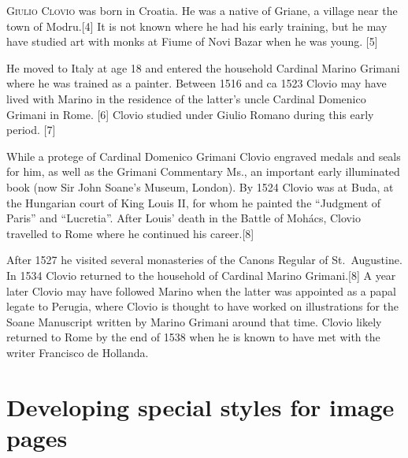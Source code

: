 \begin{greco}
\noindent \lettrine{G}{iulio Clovio} was born in Croatia. He was a native of Griane, a village near the town of Modru.[4] It is not known where he had his early training, but he may have studied art with monks at Fiume of Novi Bazar when he was young. [5] 

He moved to Italy at age 18 and entered the household Cardinal Marino Grimani where he was trained as a painter. Between 1516 and ca 1523 Clovio may have lived with Marino in the residence of the latter’s uncle Cardinal Domenico Grimani in Rome. [6] Clovio studied under Giulio Romano during this early period. [7]

While a protege of Cardinal Domenico Grimani Clovio engraved medals and seals for him, as well as the Grimani Commentary Ms., an important early illuminated book (now Sir John Soane's Museum, London).
By 1524 Clovio was at Buda, at the Hungarian court of King Louis II, for whom he painted the ``Judgment of Paris'' and ``Lucretia''. After Louis' death in the Battle of Mohács, Clovio travelled to Rome where he continued his career.[8]

After 1527 he visited several monasteries of the Canons Regular of St.~Augustine. In 1534 Clovio returned to the household of Cardinal Marino Grimani.[8] A year later Clovio may have followed Marino when the latter was appointed as a papal legate to Perugia, where Clovio is thought to have worked on illustrations for the Soane Manuscript written by Marino Grimani around that time. Clovio likely returned to Rome by the end of 1538 when he is known to have met with the writer Francisco de Hollanda.
\end{greco}

\section{Developing special styles for image pages}

\makeatother




